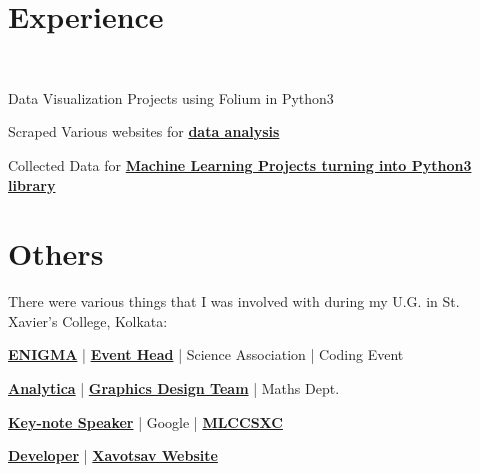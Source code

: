 \documentclass[]{deedy-resume-openfont}
\begin{document}
\begin{minipage}[t]{0.66\textwidth} 


\section{Experience}
\thinspace\\
\begin{tightemize}
\item Data Visualization Projects using Folium in Python3
\item Scraped Various websites for \textbf{\href{https://github.com/Jimut123/LeaderBehaviour}{data analysis}}
\item Collected Data for \textbf{\href{https://github.com/Jimut123/jimutmap}{Machine Learning Projects turning into Python3 library}}
\end{tightemize}
\sectionsep


\section{Others}
There were various things that I was involved with during my U.G. in St. Xavier's College, Kolkata:

\begin{tightemize}

\item \textbf{\href{https://jimut123.github.io/img/gallery/enigma_2019.jpg}{ENIGMA}} | \textbf{\href{https://drive.google.com/file/d/1na_kOeKz-qQoKZQU-KqmhgzQQj87JBF5/view}{Event Head}} | Science Association | Coding Event

\item \textbf{\href{https://jimut123.github.io/img/gallery/Analytica_2018.JPG}{Analytica}} | \textbf{\href{https://drive.google.com/file/d/19V0XR_y_J2Kwwa0wUGLs7W0D9UNHKfNl/view}{Graphics Design Team}} | Maths Dept.

\item \textbf{\href{https://jimut123.github.io/img/gallery/mlcc_sxc_2019.jpg}{Key-note Speaker}} | Google | \textbf{\href{https://drive.google.com/file/d/1vHeJ8tEzdLJO1TokufkcoPY-Ohgw6DLX/view}{MLCCSXC}}

\item \textbf{\href{https://drive.google.com/file/d/1bEblSdzQbAKvSxkpFm3sMqGE8oqqWr5R/view}{Developer}} | \textbf{\href{https://jimut123.github.io/xavo2018/}{Xavotsav Website}}


\end{tightemize}
\end{minipage}
\end{document}
